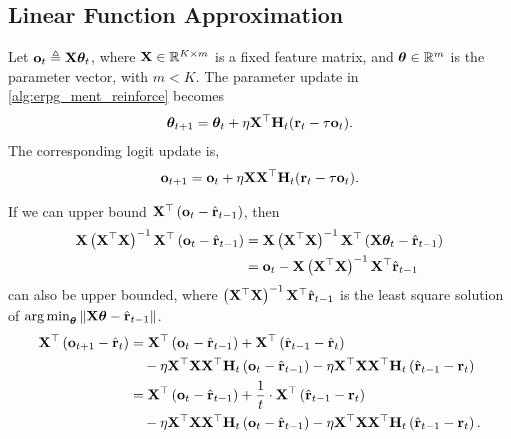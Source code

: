 \subsection{Linear Function Approximation}

Let ${\mathbf{o}}_t \triangleq {\mathbf{X}} {\boldsymbol{\theta}}_t$, where ${\mathbf{X}} \in {\mathbb{R}}^{K \times m}$ is a fixed feature matrix, and ${\boldsymbol{\theta}} \in {\mathbb{R}}^m$ is the parameter vector, with $m < K$. The parameter update in \cref{alg:erpg_ment_reinforce} becomes
\begin{equation*}
\begin{split}
    {\boldsymbol{\theta}}_{t+1} = {\boldsymbol{\theta}}_{t} + \eta {\mathbf{X}}^\top {\mathbf{H}}_t ({\mathbf{r}}_t - \tau {\mathbf{o}}_t).
\end{split}
\end{equation*}
The corresponding logit update is,
\begin{equation*}
\begin{split}
    {\mathbf{o}}_{t+1} = {\mathbf{o}}_{t} + \eta {\mathbf{X}} {\mathbf{X}}^\top {\mathbf{H}}_t ({\mathbf{r}}_t - \tau {\mathbf{o}}_t).
\end{split}
\end{equation*}

If we can upper bound ${\mathbf{X}}^\top\left( {\mathbf{o}}_{t} - \hat{{\mathbf{r}}}_{t-1} \right)$, then
\begin{equation*}
\begin{split}
    {\mathbf{X}} \left({\mathbf{X}}^\top {\mathbf{X}} \right)^{-1} {\mathbf{X}}^\top\left( {\mathbf{o}}_{t} - \hat{{\mathbf{r}}}_{t-1} \right) &= {\mathbf{X}} \left({\mathbf{X}}^\top {\mathbf{X}} \right)^{-1} {\mathbf{X}}^\top\left( {\mathbf{X}} {\boldsymbol{\theta}}_{t} - \hat{{\mathbf{r}}}_{t-1} \right) \\
    &= {\mathbf{o}}_t - {\mathbf{X}} \left({\mathbf{X}}^\top {\mathbf{X}} \right)^{-1} {\mathbf{X}}^\top \hat{{\mathbf{r}}}_{t-1}
\end{split}
\end{equation*}
can also be upper bounded, where $\left({\mathbf{X}}^\top {\mathbf{X}} \right)^{-1} {\mathbf{X}}^\top \hat{{\mathbf{r}}}_{t-1}$ is the least square solution of $\operatorname*{arg\,min}_{{\boldsymbol{\theta}}}{  \left\| {\mathbf{X}} {\boldsymbol{\theta}} - \hat{{\mathbf{r}}}_{t-1} \right\| }$.
\begin{equation*}
\begin{split}
    {\mathbf{X}}^\top\left( {\mathbf{o}}_{t+1} - \hat{{\mathbf{r}}}_{t} \right) &= {\mathbf{X}}^\top\left( {\mathbf{o}}_{t} - \hat{{\mathbf{r}}}_{t-1} \right) + {\mathbf{X}}^\top\left( \hat{{\mathbf{r}}}_{t-1} - \hat{{\mathbf{r}}}_{t} \right) \\
    &\quad - \eta {\mathbf{X}}^\top {\mathbf{X}} {\mathbf{X}}^\top {\mathbf{H}}_{t} \left( {\mathbf{o}}_{t} - \hat{{\mathbf{r}}}_{t-1} \right) - \eta {\mathbf{X}}^\top {\mathbf{X}} {\mathbf{X}}^\top {\mathbf{H}}_{t} \left( \hat{{\mathbf{r}}}_{t-1} - {\mathbf{r}}_t \right) \\
    &= {\mathbf{X}}^\top\left( {\mathbf{o}}_{t} - \hat{{\mathbf{r}}}_{t-1} \right) + \frac{1}{t} \cdot {\mathbf{X}}^\top\left( \hat{{\mathbf{r}}}_{t-1} - {\mathbf{r}}_{t} \right) \\
    &\quad - \eta {\mathbf{X}}^\top {\mathbf{X}} {\mathbf{X}}^\top {\mathbf{H}}_{t} \left( {\mathbf{o}}_{t} - \hat{{\mathbf{r}}}_{t-1} \right) - \eta {\mathbf{X}}^\top {\mathbf{X}} {\mathbf{X}}^\top {\mathbf{H}}_{t} \left( \hat{{\mathbf{r}}}_{t-1} - {\mathbf{r}}_t \right).
\end{split}
\end{equation*}

